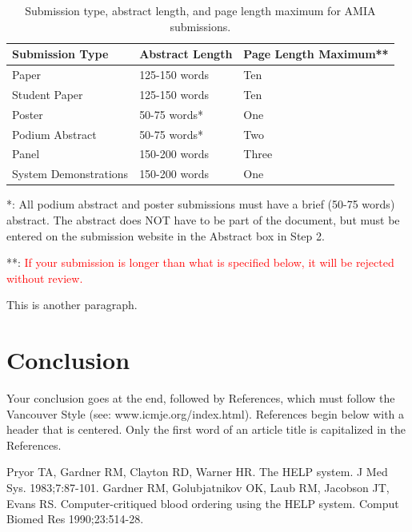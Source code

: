 \documentclass{amia}
\begin{document}
\begin{table}[h]
\centering
\caption{Submission type, abstract length, and page length maximum for AMIA submissions.}
  \begin{tabular}{|l|l|l|}
  \hline
    \textbf{Submission Type}    & \textbf{Abstract Length}  & \textbf{Page Length Maximum**} \\ \hline
    Paper  & 125-150 words  & Ten   \\ \hline
    Student Paper  & 125-150 words  & Ten \\ \hline
    Poster  &50-75 words*   & One \\ \hline
    Podium  Abstract & 50-75 words*  & Two \\ \hline
    Panel   &150-200 words  & Three \\ \hline
    System Demonstrations    &150-200 words  & One \\ \hline
  \end{tabular}
\end{table}
*: All podium abstract and poster submissions must have a brief (50-75 words) abstract. The abstract does NOT have to be part of the document, but must be entered on the submission website in the Abstract box in Step 2.

**: \textcolor{red}{If your submission is longer than what is specified below, it will be rejected without review.}

This is another paragraph.

\section*{Conclusion}
Your conclusion goes at the end, followed by References, which must follow the Vancouver Style (see: www.icmje.org/index.html).  References begin below with a header that is centered.  Only the first word of an article title is capitalized in the References. 

\makeatletter
\renewcommand{\@biblabel}[1]{\hfill #1.}
\makeatother




\begin{thebibliography}{1}
\setlength\itemsep{-0.1em}

Pryor TA, Gardner RM, Clayton RD, Warner HR. The HELP system. J Med Sys. 1983;7:87-101.
Gardner RM, Golubjatnikov OK, Laub RM, Jacobson JT, Evans RS. Computer-critiqued blood ordering using the HELP system. Comput Biomed Res 1990;23:514-28.



\end{thebibliography}
\end{document}
